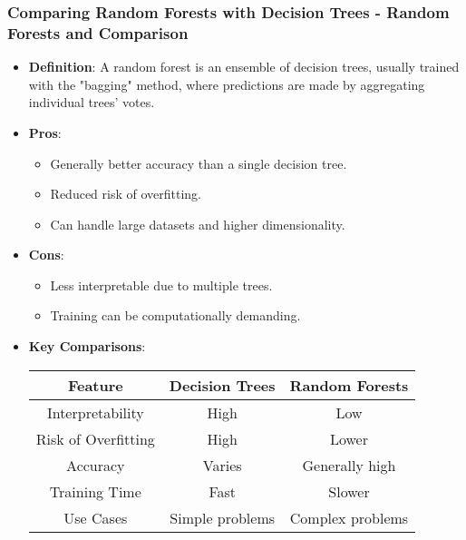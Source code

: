 \documentclass[aspectratio=169]{beamer}
\begin{document}
\begin{frame}[fragile]
    \frametitle{Comparing Random Forests with Decision Trees - Random Forests and Comparison}
    \begin{itemize}
        \item \textbf{Definition}: A random forest is an ensemble of decision trees, usually trained with the "bagging" method, where predictions are made by aggregating individual trees' votes.
        
        \item \textbf{Pros}:
        \begin{itemize}
            \item Generally better accuracy than a single decision tree.
            \item Reduced risk of overfitting.
            \item Can handle large datasets and higher dimensionality.
        \end{itemize}
        
        \item \textbf{Cons}:
        \begin{itemize}
            \item Less interpretable due to multiple trees.
            \item Training can be computationally demanding.
        \end{itemize}
        
        \item \textbf{Key Comparisons}:
        \begin{center}
            \begin{tabular}{|c|c|c|}
                \hline
                \textbf{Feature} & \textbf{Decision Trees} & \textbf{Random Forests} \\
                \hline
                Interpretability & High & Low \\
                Risk of Overfitting & High & Lower \\
                Accuracy & Varies & Generally high \\
                Training Time & Fast & Slower \\
                Use Cases & Simple problems & Complex problems \\
                \hline
            \end{tabular}
        \end{center}
    \end{itemize}
\end{frame}
\end{document}
